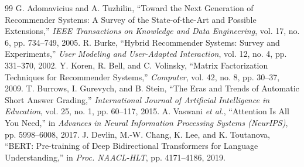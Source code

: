\documentclass[conference]{IEEEtran}
\begin{document}
\begin{thebibliography}{99}
 G. Adomavicius and A. Tuzhilin, ``Toward the Next Generation of Recommender Systems: A Survey of the State-of-the-Art and Possible Extensions,'' \emph{IEEE Transactions on Knowledge and Data Engineering}, vol. 17, no. 6, pp. 734--749, 2005.
 R. Burke, ``Hybrid Recommender Systems: Survey and Experiments,'' \emph{User Modeling and User-Adapted Interaction}, vol. 12, no. 4, pp. 331--370, 2002.
 Y. Koren, R. Bell, and C. Volinsky, ``Matrix Factorization Techniques for Recommender Systems,'' \emph{Computer}, vol. 42, no. 8, pp. 30--37, 2009.
 T. Burrows, I. Gurevych, and B. Stein, ``The Eras and Trends of Automatic Short Answer Grading,'' \emph{International Journal of Artificial Intelligence in Education}, vol. 25, no. 1, pp. 60--117, 2015.
 A. Vaswani \emph{et al.}, ``Attention Is All You Need,'' in \emph{Advances in Neural Information Processing Systems (NeurIPS)}, pp. 5998--6008, 2017.
 J. Devlin, M.-W. Chang, K. Lee, and K. Toutanova, ``BERT: Pre-training of Deep Bidirectional Transformers for Language Understanding,'' in \emph{Proc. NAACL-HLT}, pp. 4171--4186, 2019.

\end{thebibliography}
\end{document}
